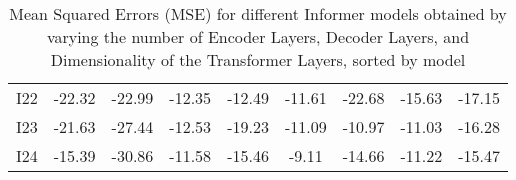 \begin{table}[]
{\begin{tabular}{ccccccccc}
    I22   & \cellcolor[HTML]{63BE7B}-22.32 & \cellcolor[HTML]{F9706D}-22.99 & \cellcolor[HTML]{FFDF82}-12.35 & \cellcolor[HTML]{FDBD7C}-12.49 & \cellcolor[HTML]{B7D67F}-11.61 & \cellcolor[HTML]{63BE7B}-22.68 & \cellcolor[HTML]{A4D07E}-15.63 & \cellcolor[HTML]{CCDC81}-17.15 \\
    I23   & \cellcolor[HTML]{A1D07E}-21.63 & \cellcolor[HTML]{FFDF82}-27.44 & \cellcolor[HTML]{EAE582}-12.53 & \cellcolor[HTML]{C8DB80}-19.23 & \cellcolor[HTML]{FFDE82}-11.09 & \cellcolor[HTML]{F8696B}-10.97 & \cellcolor[HTML]{F8696B}-11.03 & \cellcolor[HTML]{FBEA83}-16.28 \\
    I24   & \cellcolor[HTML]{F8696B}-15.39 & \cellcolor[HTML]{B6D67F}-30.86 & \cellcolor[HTML]{F9786E}-11.58 & \cellcolor[HTML]{F1E783}-15.46 & \cellcolor[HTML]{F8696B}-9.11  & \cellcolor[HTML]{FEC97E}-14.66 & \cellcolor[HTML]{F9736D}-11.22 & \cellcolor[HTML]{FCAB78}-15.47
    \end{tabular}%
    }
    \caption{Mean Squared Errors (MSE) for different Informer models obtained by varying the number of Encoder Layers, Decoder Layers, and Dimensionality of the Transformer Layers, sorted by model}
    \label{I4_M}
    \end{table}


    


